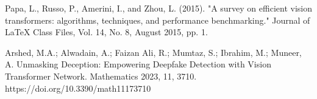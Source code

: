 \begin{thebibliography}{99}
     Papa, L., Russo, P., Amerini, I., and Zhou, L. (2015). "A survey on efficient vision transformers: algorithms, techniques, and performance benchmarking." Journal of LaTeX Class Files, Vol. 14, No. 8, August 2015, pp. 1.
    
     Arshed, M.A.; Alwadain, A.; Faizan Ali, R.; Mumtaz, S.; Ibrahim, M.; Muneer, A. Unmasking Deception: Empowering Deepfake Detection with Vision Transformer Network. Mathematics 2023, 11, 3710. https://doi.org/10.3390/math11173710
\end{thebibliography}
